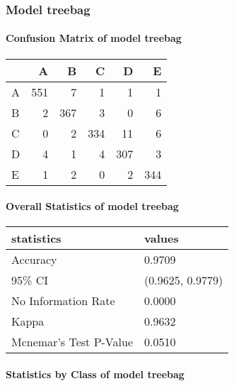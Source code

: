 \documentclass[]{article}
\let\oldparagraph\paragraph
\renewcommand{\paragraph}[1]{\oldparagraph{#1}\mbox{}}
\begin{document}
\subsubsection{Model treebag}\label{model-treebag}

\paragraph{Confusion Matrix of model
treebag}\label{confusion-matrix-of-model-treebag}

\begin{table}[H]
\centering
\begin{tabular}{l|r|r|r|r|r}
\hline
  & A & B & C & D & E\\
\hline
A & 551 & 7 & 1 & 1 & 1\\
\hline
B & 2 & 367 & 3 & 0 & 6\\
\hline
C & 0 & 2 & 334 & 11 & 6\\
\hline
D & 4 & 1 & 4 & 307 & 3\\
\hline
E & 1 & 2 & 0 & 2 & 344\\
\hline
\end{tabular}
\end{table}

\paragraph{Overall Statistics of model
treebag}\label{overall-statistics-of-model-treebag}

\begin{table}[H]
\centering
\begin{tabular}{l|l}
\hline
statistics & values\\
\hline
Accuracy & 0.9709\\
\hline
95\% CI & (0.9625, 0.9779)\\
\hline
No Information Rate & 0.0000\\
\hline
Kappa & 0.9632\\
\hline
Mcnemar's Test P-Value & 0.0510\\
\hline
\end{tabular}
\end{table}

\paragraph{Statistics by Class of model
treebag}\label{statistics-by-class-of-model-treebag}

\begingroup\fontsize{11}{13}\selectfont
\end{document}
